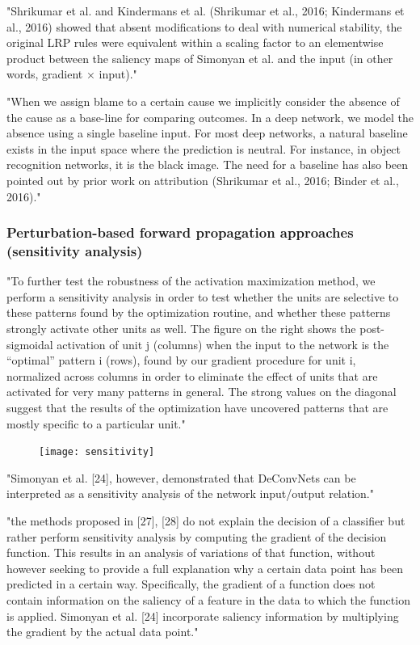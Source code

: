 	"Shrikumar et al. and Kindermans et al. (Shrikumar et al., 2016; Kindermans et al., 2016) showed that absent modifications to deal with numerical stability, the original LRP rules were equivalent within a scaling factor to an elementwise product between the saliency maps of Simonyan et al. and the input (in other words, gradient × input)." \cite{Shrikumar2017}
	
	"When we assign blame to a certain cause we implicitly consider the absence of the cause as a base-line for comparing outcomes. In a deep network, we model the absence using a single baseline input. For most deep networks, a natural baseline exists in the input space where the prediction is neutral. For instance, in object recognition networks, it is the black image. The need for a baseline has	also been pointed out by prior work on attribution (Shrikumar et al., 2016; Binder et al., 2016)." \cite{Sundararajan2017}
		
		\subsubsection{Perturbation-based forward propagation approaches (sensitivity analysis)}
		"To further test the robustness of the activation maximization method, we perform a sensitivity analysis in order to test whether the units are selective to these patterns found by the optimization routine, and whether these patterns strongly activate other units as well. The figure on the right shows the post-sigmoidal activation of unit j (columns) when the input to the network is the “optimal” pattern i (rows), found by our gradient procedure for unit i, normalized across columns in order to eliminate the effect of units that are activated for very many patterns in general. The strong values on the diagonal suggest that the results of the optimization have uncovered patterns that are mostly specific to a particular unit." \cite{Erhan2009}
		\begin{figure}[h]
			\centering
			\texttt{[image: sensitivity]}
		\end{figure}
		
		"Simonyan et al. [24], however, demonstrated that DeConvNets can be interpreted as a sensitivity analysis of the network input/output relation." \cite{Mahendran2015}
		
		"the methods proposed in [27], [28] do not explain the decision of a classifier but rather perform sensitivity analysis by computing the gradient of the decision function. This results in an analysis of variations of that function, without however seeking to provide a full explanation why a certain data point has been predicted in a certain way. Specifically, the gradient of a function does not contain information on the saliency of a feature in the data to which the function is applied. Simonyan et al. [24] incorporate saliency information by multiplying the gradient by the actual data point." \cite{Montavon2017}
		
